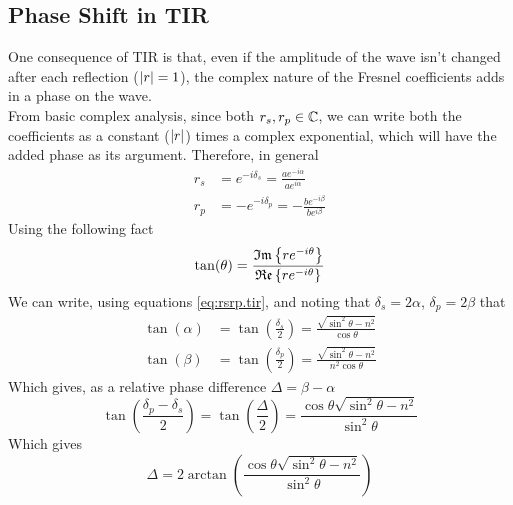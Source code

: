 \documentclass[../electromagnetism.tex]{subfiles}
\begin{document}
\subsection{Phase Shift in TIR}
One consequence of TIR is that, even if the amplitude of the wave isn't changed after each reflection ($\abs{r}=1$), the complex nature of the Fresnel coefficients adds in a phase on the wave.\\
From basic complex analysis, since both $r_s, r_p\in\operatorname{\mathbb{C}}$, we can write both the coefficients as a constant ($\abs{r}$) times a complex exponential, which will have the added phase as its argument. Therefore, in general
\begin{equation*}
	\begin{aligned}
		r_s&= e^{-i\delta_s}=\frac{ae^{-i\alpha}}{ae^{i\alpha}}\\
		r_p&= -e^{-i\delta_p}=-\frac{be^{-i\beta}}{be^{i\beta}}
	\end{aligned}
\end{equation*}
Using the following fact
\begin{equation*}
	\tan(\theta)=\frac{\mathfrak{Im}\left\{re^{-i\theta}\right\}}{\mathfrak{Re}\left\{re^{-i\theta}\right\}}
\end{equation*}
We can write, using equations \eqref{eq:rsrp.tir}, and noting that $\delta_s=2\alpha$, $\delta_p=2\beta$ that
\begin{equation*}
	\begin{aligned}
		\tan(\alpha)&= \tan\left( \frac{\delta_s}{2} \right)=\frac{\sqrt{\sin^2\theta-n^2}}{\cos\theta}\\
		\tan(\beta)&= \tan\left( \frac{\delta_p}{2} \right)=\frac{\sqrt{\sin^2\theta-n^2}}{n^2\cos\theta}
	\end{aligned}
\end{equation*}
Which gives, as a relative phase difference $\Delta=\beta-\alpha$
\begin{equation}
	\tan\left( \frac{\delta_p-\delta_s}{2} \right)=\tan\left( \frac{\Delta}{2} \right)=\frac{\cos\theta\sqrt{\sin^2\theta-n^2}}{\sin^2\theta}
	\label{eq:tanphdiff.tir}
\end{equation}
Which gives
\begin{equation}
	\Delta=2\arctan\left( \frac{\cos\theta\sqrt{\sin^2\theta-n^2}}{\sin^2\theta} \right)
	\label{eq:phdiff.tir}
\end{equation}
\end{document}

